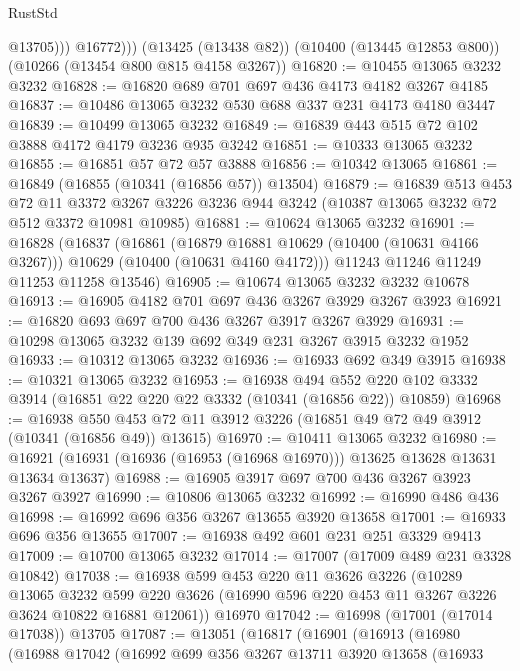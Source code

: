 \begin{lexlean}{RustStd}
\begin{coremodule}
                @13705)))
          @16772)))
    (@13425 (@13438 @82))
    (@10400 (@13445 @12853 @800))
    (@10266 (@13454 @800 @815 @4158 @3267))
@16820 := @10455 @13065 @3232 @3232
@16828 := @16820 @689 @701 @697 @436 @4173 @4182 @3267 @4185
@16837 := @10486 @13065 @3232 @530 @688 @337 @231 @4173 @4180 @3447
@16839 := @10499 @13065 @3232
@16849 := @16839 @443 @515 @72 @102 @3888 @4172 @4179 @3236 @935 @3242
@16851 := @10333 @13065 @3232
@16855 := @16851 @57 @72 @57 @3888
@16856 := @10342 @13065
@16861 := @16849 (@16855 (@10341 (@16856 @57)) @13504)
@16879 := @16839
    @513
    @453
    @72
    @11
    @3372
    @3267
    @3226
    @3236
    @944
    @3242
    (@10387 @13065 @3232 @72 @512 @3372 @10981 @10985)
@16881 := @10624 @13065 @3232
@16901 := @16828
    (@16837
      (@16861
        (@16879 @16881 @10629 (@10400 (@10631 @4166 @3267)))
        @10629
        (@10400 (@10631 @4160 @4172)))
      @11243
      @11246
      @11249
      @11253
      @11258
      @13546)
@16905 := @10674 @13065 @3232 @3232 @10678
@16913 := @16905 @4182 @701 @697 @436 @3267 @3929 @3267 @3923
@16921 := @16820 @693 @697 @700 @436 @3267 @3917 @3267 @3929
@16931 := @10298 @13065 @3232 @139 @692 @349 @231 @3267 @3915 @3232 @1952
@16933 := @10312 @13065 @3232
@16936 := @16933 @692 @349 @3915
@16938 := @10321 @13065 @3232
@16953 := @16938
    @494
    @552
    @220
    @102
    @3332
    @3914
    (@16851 @22 @220 @22 @3332 (@10341 (@16856 @22)) @10859)
@16968 := @16938
    @550
    @453
    @72
    @11
    @3912
    @3226
    (@16851 @49 @72 @49 @3912 (@10341 (@16856 @49)) @13615)
@16970 := @10411 @13065 @3232
@16980 := @16921 (@16931 (@16936 (@16953 (@16968 @16970))) @13625 @13628 @13631 @13634 @13637)
@16988 := @16905 @3917 @697 @700 @436 @3267 @3923 @3267 @3927
@16990 := @10806 @13065 @3232
@16992 := @16990 @486 @436
@16998 := @16992 @696 @356 @3267 @13655 @3920 @13658
@17001 := @16933 @696 @356 @13655
@17007 := @16938 @492 @601 @231 @251 @3329 @9413
@17009 := @10700 @13065 @3232
@17014 := @17007 (@17009 @489 @231 @3328 @10842)
@17038 := @16938
    @599
    @453
    @220
    @11
    @3626
    @3226
    (@10289
      @13065
      @3232
      @599
      @220
      @3626
      (@16990 @596 @220 @453 @11 @3267 @3226 @3624 @10822 @16881 @12061))
    @16970
@17042 := @16998 (@17001 (@17014 @17038)) @13705
@17087 := @13051
    (@16817
      (@16901
        (@16913
          (@16980
            (@16988
              @17042
              (@16992
                @699
                @356
                @3267
                @13711
                @3920
                @13658
                (@16933

\end{coremodule}
\end{lexlean}
